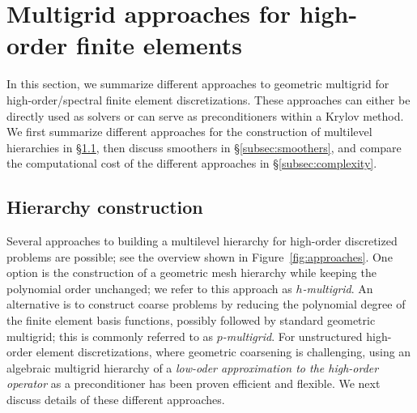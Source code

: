 \documentclass[smallcondensed,final]{svjour3}     %
\newcommand{\todo}[1]{\textcolor{red}{ #1}}
\begin{document}







\section{Multigrid approaches for high-order finite elements}
\label{sec:approaches}

In this section, we summarize different approaches to geometric
multigrid for high-order/spectral finite element
discretizations. These approaches can either be directly used as
solvers or can serve as preconditioners within a Krylov method. We
first summarize different approaches for the construction of
multilevel hierarchies in \S\ref{subsec:hierarchy}, then discuss
smoothers in \S\ref{subsec:smoothers}, and compare the
computational cost of the different approaches in
\S\ref{subsec:complexity}.

\subsection{Hierarchy construction}\label{subsec:hierarchy}
Several approaches to building a multilevel hierarchy for high-order
discretized problems are possible; see the overview shown in
Figure~\ref{fig:approaches}. One option is the construction of a
geometric mesh hierarchy while keeping the polynomial order unchanged;
we refer to this approach as \emph{$h$-multigrid}. An
alternative is to construct coarse problems by reducing the polynomial
degree of the finite element basis functions, possibly followed by
standard geometric multigrid; this is
commonly referred to as \emph{$p$-multigrid}. For unstructured
high-order element discretizations, where geometric coarsening is
challenging, using an algebraic multigrid hierarchy of a \emph{low-oder
approximation to the high-order operator} as a preconditioner has been
proven efficient and flexible. We next discuss details of these
different approaches.
\end{document}
